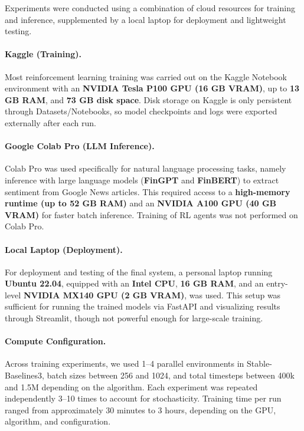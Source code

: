 \documentclass[12pt,a4paper]{report}
\begin{document}
Experiments were conducted using a combination of cloud resources for training and inference, 
supplemented by a local laptop for deployment and lightweight testing. 

\paragraph{Kaggle (Training).} 
Most reinforcement learning training was carried out on the Kaggle Notebook environment 
with an \textbf{NVIDIA Tesla P100 GPU (16 GB VRAM)}, 
up to \textbf{13 GB RAM}, and \textbf{73 GB disk space}. 
Disk storage on Kaggle is only persistent through Datasets/Notebooks, 
so model checkpoints and logs were exported externally after each run. 

\paragraph{Google Colab Pro (LLM Inference).} 
Colab Pro was used specifically for natural language processing tasks, 
namely inference with large language models (\textbf{FinGPT} and \textbf{FinBERT}) 
to extract sentiment from Google News articles. 
This required access to a \textbf{high-memory runtime (up to 52 GB RAM)} 
and an \textbf{NVIDIA A100 GPU (40 GB VRAM)} for faster batch inference. 
Training of RL agents was not performed on Colab Pro. 

\paragraph{Local Laptop (Deployment).} 
For deployment and testing of the final system, a personal laptop running 
\textbf{Ubuntu 22.04}, equipped with an \textbf{Intel CPU}, 
\textbf{16 GB RAM}, and an entry-level \textbf{NVIDIA MX140 GPU (2 GB VRAM)}, 
was used. This setup was sufficient for running the trained models via FastAPI and 
visualizing results through Streamlit, though not powerful enough for large-scale training. 

\paragraph{Compute Configuration.} 
Across training experiments, we used 1--4 parallel environments in Stable-Baselines3, 
batch sizes between 256 and 1024, and total timesteps between 400k and 1.5M depending on the algorithm. 
Each experiment was repeated independently 3--10 times to account for stochasticity. 
Training time per run ranged from approximately 30 minutes to 3 hours, 
depending on the GPU, algorithm, and configuration.
\end{document}

